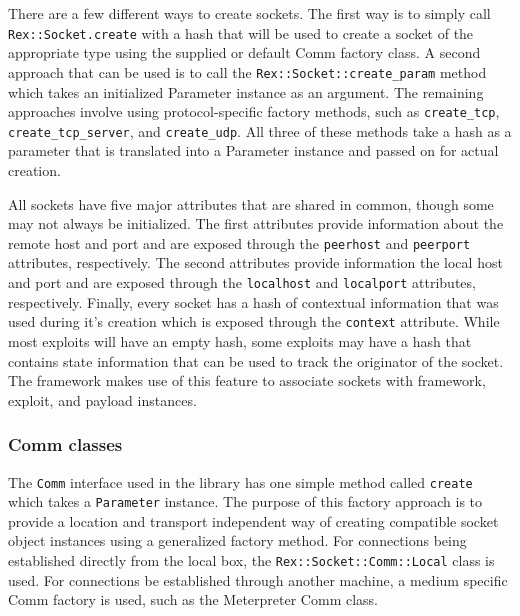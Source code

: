 \documentclass{report}
\begin{document}
\par
There are a few different ways to create sockets.  The first way is
to simply call \texttt{Rex::Socket.create} with a hash that will be
used to create a socket of the appropriate type using the supplied
or default Comm factory class.  A second approach that can be used
is to call the \texttt{Rex::Socket::create\_param} method which
takes an initialized Parameter instance as an argument.  The
remaining approaches involve using protocol-specific factory
methods, such as \texttt{create\_tcp}, \texttt{create\_tcp\_server},
and \texttt{create\_udp}.  All three of these methods take a hash as
a parameter that is translated into a Parameter instance and passed
on for actual creation.

\par
All sockets have five major attributes that are shared in common,
though some may not always be initialized.  The first attributes
provide information about the remote host and port and are exposed
through the \texttt{peerhost} and \texttt{peerport} attributes,
respectively.  The second attributes provide information the local
host and port and are exposed through the \texttt{localhost} and
\texttt{localport} attributes, respectively.  Finally, every socket
has a hash of contextual information that was used during it's
creation which is exposed through the \texttt{context} attribute.
While most exploits will have an empty hash, some exploits may have
a hash that contains state information that can be used to track the
originator of the socket.  The framework makes use of this feature
to associate sockets with framework, exploit, and payload instances.

            \subsubsection{Comm classes}

\par
The \texttt{Comm} interface used in the library has one simple
method called \texttt{create} which takes a \texttt{Parameter}
instance.  The purpose of this factory approach is to provide a
location and transport independent way of creating compatible socket
object instances using a generalized factory method.  For
connections being established directly from the local box, the
\texttt{Rex::Socket::Comm::Local} class is used.  For connections be
established through another machine, a medium specific Comm factory
is used, such as the Meterpreter Comm class.
\end{document}
